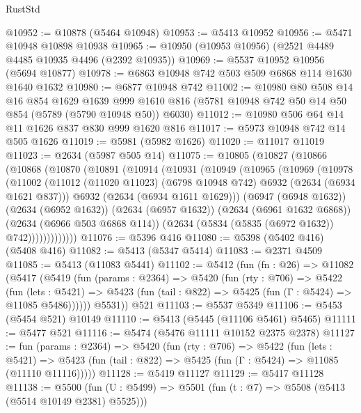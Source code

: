 \begin{lexlean}{RustStd}
\begin{coremodule}
@10952 := @10878 (@5464 @10948)
@10953 := @5413 @10952
@10956 := @5471 @10948 @10898 @10938
@10965 := @10950 (@10953 @10956) (@2521 @4489 @4485 @10935 @4496 (@2392 @10935))
@10969 := @5537 @10952 @10956 (@5694 @10877)
@10978 := @6863 @10948 @742 @503 @509 @6868 @114 @1630 @1640 @1632
@10980 := @6877 @10948 @742
@11002 := @10980
    @80
    @508
    @14
    @16
    @854
    @1629
    @1639
    @999
    @1610
    @816
    (@5781 @10948 @742 @50 @14 @50 @854 (@5789 (@5790 @10948 @50)) @6030)
@11012 := @10980 @506 @64 @14 @11 @1626 @837 @830 @999 @1620 @816
@11017 := @5973 @10948 @742 @14 @505 @1626
@11019 := @5981 (@5982 @1626)
@11020 := @11017 @11019
@11023 := @2634 (@5987 @505 @14)
@11075 := @10805
    (@10827
      (@10866
        (@10868
          (@10870
            (@10891
              (@10914
                (@10931
                  (@10949
                    (@10965
                      (@10969
                        (@10978
                          (@11002
                            (@11012
                              (@11020 @11023)
                              (@6798 @10948 @742)
                              @6932
                              (@2634 (@6934 @1621 @837)))
                            @6932
                            (@2634 (@6934 @1611 @1629)))
                          (@6947 (@6948 @1632))
                          (@2634 (@6952 @1632))
                          (@2634 (@6957 @1632))
                          (@2634 (@6961 @1632 @6868))
                          (@2634 (@6966 @503 @6868 @114))
                          (@2634 (@5834 (@5835 (@6972 @1632)) @742)))))))))))))
@11076 := @5396 @416
@11080 := @5398 (@5402 @416) (@5408 @416)
@11082 := @5413 (@5347 @5414)
@11083 := @2371 @4509
@11085 := @5413 (@11083 @5441)
@11102 := @5412
    (fun (fn : @26) =>
    @11082
      (@5417
        (@5419
          (fun (params : @2364) =>
          @5420
            (fun (rty : @706) =>
            @5422
              (fun (lets : @5421) =>
              @5423 (fun (tail : @822) => @5425 (fun (Γ : @5424) => @11085 @5486))))))
        @5531))
    @521
@11103 := @5537 @5349
@11106 := @5453 (@5454 @521) @10149
@11110 := @5413 (@5445 (@11106 @5461) @5465)
@11111 := @5477 @521
@11116 := @5474 (@5476 @11111 @10152 @2375 @2378)
@11127 := fun (params : @2364) =>
  @5420
    (fun (rty : @706) =>
    @5422
      (fun (lets : @5421) =>
      @5423 (fun (tail : @822) => @5425 (fun (Γ : @5424) => @11085 (@11110 @11116)))))
@11128 := @5419 @11127
@11129 := @5417 @11128
@11138 := @5500
    (fun (U : @5499) => @5501 (fun (t : @7) => @5508 (@5413 (@5514 @10149 @2381) @5525)))

\end{coremodule}
\end{lexlean}
